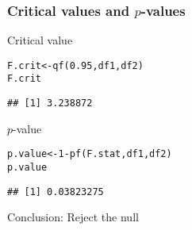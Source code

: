 \documentclass[color=usenames,dvipsnames]{beamer}\usepackage[]{graphicx}\usepackage[]{color}
\makeatletter
\newcommand{\hlnum}[1]{\textcolor[rgb]{0.69,0.494,0}{#1}}%
\newcommand{\hlopt}[1]{\textcolor[rgb]{0,0,0}{#1}}%
\newcommand{\hlstd}[1]{\textcolor[rgb]{0,0,0}{#1}}%
\newcommand{\hlkwb}[1]{\textcolor[rgb]{0,0.341,0.682}{#1}}%
\newcommand{\hlkwd}[1]{\textcolor[rgb]{0.004,0.004,0.506}{#1}}%
\newenvironment{kframe}{%
 \def\at@end@of@kframe{}%
 \ifinner\ifhmode%
  \def\at@end@of@kframe{\end{minipage}}%
  \begin{minipage}{\columnwidth}%
 \fi\fi%
 \def\FrameCommand##1{\hskip\@totalleftmargin \hskip-\fboxsep
 \colorbox{shadecolor}{##1}\hskip-\fboxsep
     \hskip-\linewidth \hskip-\@totalleftmargin \hskip\columnwidth}%
 \MakeFramed {\advance\hsize-\width
   \@totalleftmargin\z@ \linewidth\hsize
   \@setminipage}}%
 {\par\unskip\endMakeFramed%
 \at@end@of@kframe}
\newenvironment{knitrout}{}{} %
\makeatother
\begin{document}
\begin{frame}[fragile]
  \frametitle{Critical values and $p$-values}
  {%
    Critical value}
\begin{knitrout}
\color{fgcolor}\begin{kframe}
\begin{alltt}
\hlstd{F.crit} \hlkwb{<-} \hlkwd{qf}\hlstd{(}\hlnum{0.95}\hlstd{, df1, df2)}
\hlstd{F.crit}
\end{alltt}
\begin{verbatim}
## [1] 3.238872
\end{verbatim}
\end{kframe}
\end{knitrout}
\pause
\vfill
  {%
    $p$-value}
\begin{knitrout}
\color{fgcolor}\begin{kframe}
\begin{alltt}
\hlstd{p.value} \hlkwb{<-} \hlnum{1} \hlopt{-} \hlkwd{pf}\hlstd{(F.stat, df1, df2)}
\hlstd{p.value}
\end{alltt}
\begin{verbatim}
## [1] 0.03823275
\end{verbatim}
\end{kframe}
\end{knitrout}
\pause
\vfill
Conclusion: Reject the null
\end{frame}





\begin{comment}
\begin{frame}[fragile]
  \frametitle{A fake dataset}

  \end{tiny}
\end{frame}
\end{comment}
\end{document}
